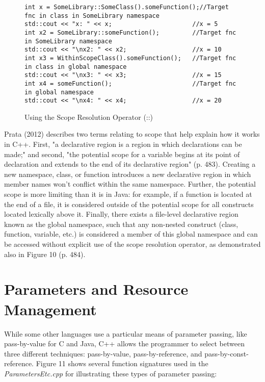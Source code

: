 \documentclass[11pt]{article}
\begin{document}
\begin{figure}[!h]
\centering
\begin{BVerbatim}
int x = SomeLibrary::SomeClass().someFunction();//Target fnc in class in SomeLibrary namespace
std::cout << "x: " << x;                      //x = 5
int x2 = SomeLibrary::someFunction();         //Target fnc in SomeLibrary namespace
std::cout << "\nx2: " << x2;                  //x = 10
int x3 = WithinScopeClass().someFunction();   //Target fnc in class in global namespace
std::cout << "\nx3: " << x3;                  //x = 15
int x4 = someFunction();                      //Target fnc in global namespace
std::cout << "\nx4: " << x4;                  //x = 20
\end{BVerbatim}
\caption{Using the Scope Resolution Operator (::)}
\end{figure} \FloatBarrier

	Prata (2012) describes two terms relating to scope that help explain how it works in C++.  First, "a declarative region is a region in which declarations can be made;" and second, "the potential scope for a variable begins at its point of declaration and extends to the end of its declarative region" (p. 483).  Creating a new namespace, class, or function introduces a new declarative region in which member names won't conflict within the same namespace.  Further, the potential scope is more limiting than it is in Java: for example, if a function is located at the end of a file, it is considered outside of the potential scope for all constructs located lexically above it.  Finally, there exists a file-level declarative region known as the global namespace, such that any non-nested construct (class, function, variable, etc.) is considered a member of this global namespace and can be accessed without explicit use of the scope resolution operator, as demonstrated also in Figure 10 (p. 484).
	
\section{Parameters and Resource Management}

	While some other languages use a particular means of parameter passing, like pass-by-value for C and Java, C++ allows the programmer to select between three different techniques: pass-by-value, pass-by-reference, and pass-by-const-reference.  Figure 11 shows several function signatures used in the \textit{ParametersEtc.cpp} for illustrating these types of parameter passing:
\end{document}
